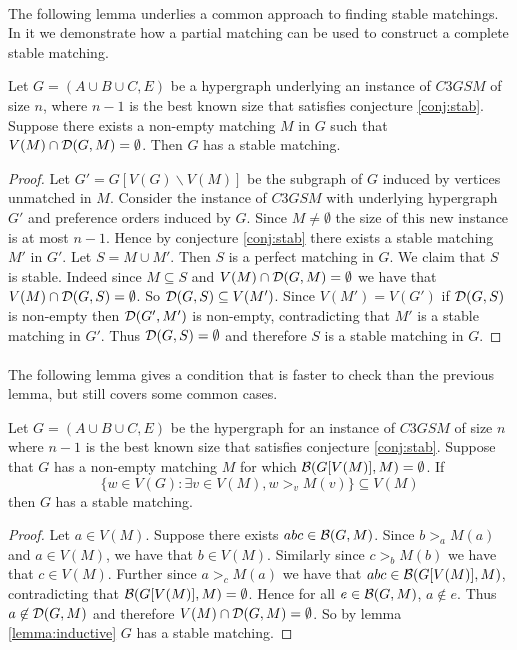 \paragraph{}
The following lemma underlies a common approach to finding stable matchings. In it we demonstrate how a partial matching can be used to construct a complete stable matching.
\begin{lemma}\label{lemma:inductive}
Let $G=(A\cup B \cup C, E)$ be a hypergraph underlying an instance of $C3GSM$ of size $n$, where $n-1$ is the best known size that satisfies conjecture \ref{conj:stab}. Suppose there exists a non-empty matching $M$ in $G$ such that $V(M) \cap \mathcal{D}(G,M) = \emptyset$. Then $G$ has a stable matching.
\end{lemma}
\begin{proof}
Let $G' = G[V(G)\backslash V(M)]$ be the subgraph of $G$ induced by vertices unmatched in $M$.  Consider the instance of $C3GSM$ with underlying hypergraph $G'$ and preference orders induced by $G$. Since $M \neq \emptyset$ the size of this new instance is at most $n-1$. Hence by conjecture \ref{conj:stab} there exists a stable matching $M'$ in $G'$. Let $S = M \cup M'$. Then $S$ is a perfect matching in $G$. We claim that $S$ is stable. Indeed since $M \subseteq S$ and $V(M) \cap \mathcal{D}(G,M) = \emptyset$ we have that $V(M) \cap \mathcal{D}(G,S) = \emptyset$. So $\mathcal{D}(G,S) \subseteq V(M')$. Since $V(M') = V(G')$ if $\mathcal{D}(G,S)$ is non-empty then $\mathcal{D}(G', M')$ is non-empty, contradicting that $M'$ is a stable matching in $G'$. Thus $\mathcal{D}(G,S) = \emptyset$ and therefore $S$ is a stable matching in $G$.
\end{proof}

\paragraph{}
The following lemma gives a condition that is faster to check than the previous lemma, but still covers some common cases.

\begin{lemma}\label{lemma:partialstab}
Let $G = (A\cup B \cup C, E)$ be the hypergraph for an instance of $C3GSM$ of size $n$ where $n-1$ is the best known size that  satisfies conjecture \ref{conj:stab}. Suppose that $G$ has a non-empty matching $M$ for which $\mathcal{B}(G[V(M)],M) = \emptyset$. If $$\{w \in V(G): \exists v \in V(M), w >_v M(v)\} \subseteq V(M)$$ then $G$ has a stable matching.
\end{lemma}
\begin{proof}
Let $a \in V(M)$. Suppose there exists $abc \in \mathcal{B}(G,M)$. Since $b >_a M(a)$ and $a \in V(M)$, we have that $b \in V(M)$. Similarly since $c >_b M(b)$ we have that $c \in V(M)$. Further since $a >_c M(a)$ we have that $abc \in \mathcal{B}(G[V(M)],M)$, contradicting that $\mathcal{B}(G[V(M)],M) = \emptyset$. Hence for all $e \in \mathcal{B}(G,M)$, $a \not\in e$. Thus $a\not \in \mathcal{D}(G,M)$ and therefore $V(M) \cap \mathcal{D}(G,M) = \emptyset$. So by lemma \ref{lemma:inductive} $G$ has a stable matching.
\end{proof}
